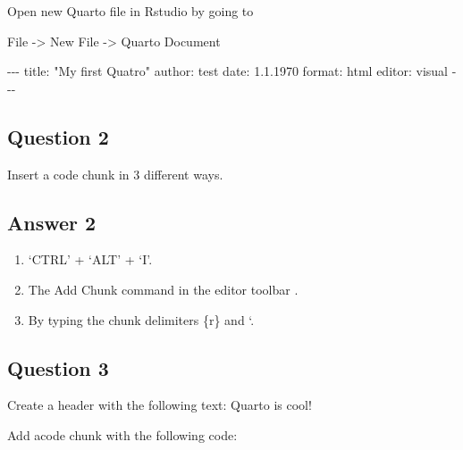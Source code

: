 \documentclass[
  letterpaper,
  DIV=11,
  numbers=noendperiod]{scrartcl}
\newenvironment{Shaded}{\begin{snugshade}}{\end{snugshade}}
\newcommand{\AttributeTok}[1]{\textcolor[rgb]{0.40,0.46,0.14}{#1}}
\newcommand{\DecValTok}[1]{\textcolor[rgb]{0.68,0.00,0.00}{#1}}
\newcommand{\FloatTok}[1]{\textcolor[rgb]{0.68,0.00,0.00}{#1}}
\newcommand{\FunctionTok}[1]{\textcolor[rgb]{0.28,0.35,0.67}{#1}}
\newcommand{\NormalTok}[1]{\textcolor[rgb]{0.00,0.46,0.62}{#1}}
\newcommand{\SpecialCharTok}[1]{\textcolor[rgb]{0.37,0.37,0.37}{#1}}
\newcommand{\StringTok}[1]{\textcolor[rgb]{0.13,0.47,0.30}{#1}}
\begin{document}
Open new Quarto file in Rstudio by going to

File -\textgreater{} New File -\textgreater{} Quarto Document

\begin{Shaded}
\begin{Highlighting}[]
\SpecialCharTok{{-}{-}{-}}
\NormalTok{title}\SpecialCharTok{:} \StringTok{"My first Quatro"}
\NormalTok{author}\SpecialCharTok{:}\NormalTok{ test }
\NormalTok{date}\SpecialCharTok{:} \DecValTok{1}\NormalTok{.}\FloatTok{1.1970}
\NormalTok{format}\SpecialCharTok{:}\NormalTok{ html}
\NormalTok{editor}\SpecialCharTok{:}\NormalTok{ visual}
\SpecialCharTok{{-}{-}{-}}
\end{Highlighting}
\end{Shaded}

\hypertarget{question-2}{%
\subsection{Question 2}\label{question-2}}

Insert a code chunk in 3 different ways.

\hypertarget{answer-2}{%
\subsection{Answer 2}\label{answer-2}}

\begin{enumerate}
\def\labelenumi{\arabic{enumi}.}
\item
  `CTRL' + `ALT' + `I'.
\item
  The Add Chunk command in the editor toolbar .
\item
  By typing the chunk delimiters \{r\} and `.
\end{enumerate}

\hypertarget{question-3}{%
\subsection{Question 3}\label{question-3}}

Create a header with the following text: Quarto is cool!

Add acode chunk with the following code:

\begin{Shaded}
\end{Shaded}
\end{document}
